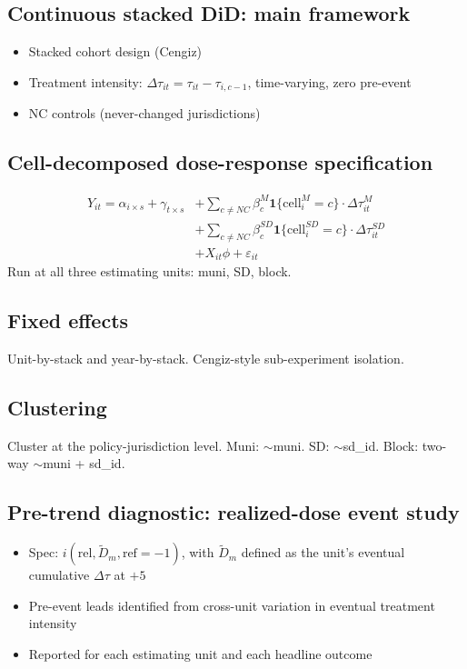 \documentclass{article}
\begin{document}
\subsection{Continuous stacked DiD: main framework}
\begin{itemize}
  \item Stacked cohort design (Cengiz)
  \item Treatment intensity:
    \(\Delta\tau_{it} = \tau_{it} - \tau_{i,c-1}\), time-varying, zero
    pre-event
  \item NC controls (never-changed jurisdictions)
\end{itemize}

\subsection{Cell-decomposed dose-response specification}
\begin{equation*}
\begin{split}
Y_{it} = \alpha_{i \times s} + \gamma_{t \times s}
&+ \sum_{c \neq NC} \beta^{M}_c \mathbf{1}\{\text{cell}^M_i = c\}
    \cdot \Delta\tau^M_{it} \\
&+ \sum_{c \neq NC} \beta^{SD}_c \mathbf{1}\{\text{cell}^{SD}_i = c\}
    \cdot \Delta\tau^{SD}_{it} \\
&+ X_{it}\phi + \varepsilon_{it}
\end{split}
\end{equation*}
Run at all three estimating units: muni, SD, block.

\subsection{Fixed effects}
Unit-by-stack and year-by-stack. Cengiz-style sub-experiment
isolation.

\subsection{Clustering}
Cluster at the policy-jurisdiction level. Muni: $\sim$muni. SD:
$\sim$sd\_id. Block: two-way $\sim$muni + sd\_id.

\subsection{Pre-trend diagnostic: realized-dose event study}
\begin{itemize}
  \item Spec: $i(\text{rel}, \widetilde{D}_m, \text{ref} = -1)$, with
    $\widetilde{D}_m$ defined as the unit's eventual cumulative
    $\Delta\tau$ at $+5$
  \item Pre-event leads identified from cross-unit variation in
    eventual treatment intensity
  \item Reported for each estimating unit and each headline outcome
\end{itemize}
\end{document}
